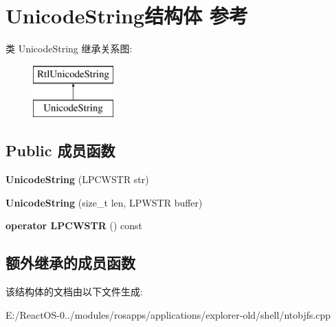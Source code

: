 \hypertarget{struct_unicode_string}{}\section{Unicode\+String结构体 参考}
\label{struct_unicode_string}
类 Unicode\+String 继承关系图\+:\begin{figure}[H]
\begin{center}
\leavevmode
\includegraphics[height=2.000000cm]{struct_unicode_string}
\end{center}
\end{figure}
\subsection*{Public 成员函数}
\begin{DoxyCompactItemize}
\item 
\mbox{\label{struct_unicode_string_aa03f035b13d5fed77e56a6f87d0f84ac}} 
{\bfseries Unicode\+String} (L\+P\+C\+W\+S\+TR str)
\item 
\mbox{\label{struct_unicode_string_a6ed614efad10f20a17205112bd0d4fc3}} 
{\bfseries Unicode\+String} (size\+\_\+t len, L\+P\+W\+S\+TR buffer)
\item 
\mbox{\label{struct_unicode_string_ac340774584043dfd49cb79f742036420}} 
{\bfseries operator L\+P\+C\+W\+S\+TR} () const
\end{DoxyCompactItemize}
\subsection*{额外继承的成员函数}


该结构体的文档由以下文件生成\+:\begin{DoxyCompactItemize}
\item 
E\+:/\+React\+O\+S-\/0../modules/rosapps/applications/explorer-\/old/shell/ntobjfs.\+cpp\end{DoxyCompactItemize}
